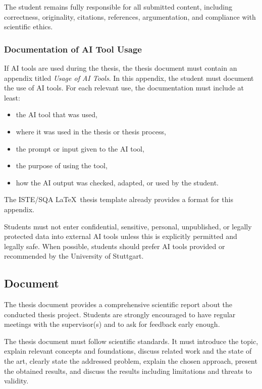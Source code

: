 \documentclass[11pt,a4paper]{article}
\begin{document}
The student remains fully responsible for all submitted content, including correctness, originality, citations, references, argumentation, and compliance with scientific ethics.

\subsubsection*{Documentation of AI Tool Usage}
If AI tools are used during the thesis, the thesis document must contain an appendix titled \emph{Usage of AI Tools}.
In this appendix, the student must document the use of AI tools.
For each relevant use, the documentation must include at least:
\begin{itemize}
    \item the AI tool that was used,
    \item where it was used in the thesis or thesis process,
    \item the prompt or input given to the AI tool,
    \item the purpose of using the tool,
    \item how the AI output was checked, adapted, or used by the student.
\end{itemize}

The ISTE/SQA \LaTeX\ thesis template already provides a format for this appendix.

Students must not enter confidential, sensitive, personal, unpublished, or legally protected data into external AI tools unless this is explicitly permitted and legally safe.
When possible, students should prefer AI tools provided or recommended by the University of Stuttgart.

\subsection{Document}
The thesis document provides a comprehensive scientific report about the conducted thesis project.
Students are strongly encouraged to have regular meetings with the supervisor(s) and to ask for feedback early enough.

The thesis document must follow scientific standards. It must introduce the topic, explain relevant concepts and foundations, discuss related work and the state of the art, clearly state the addressed problem, explain the chosen approach, present the obtained results, and discuss the results including limitations and threats to validity.
\end{document}
